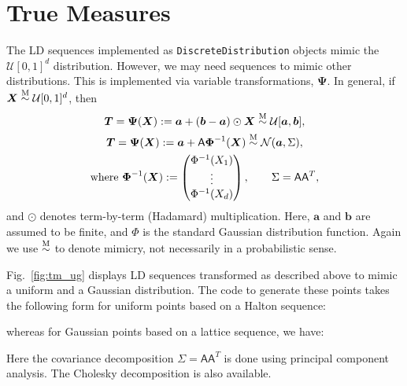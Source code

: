 \documentclass[graybox]{svmult}
\begin{document}
\section{True Measures}

The LD sequences implemented as \texttt{DiscreteDistribution} objects mimic the $\mathcal{U}[0,1]^d$ distribution.  However, we may need sequences to mimic other distributions.  This is implemented via variable transformations, $\boldsymbol{\Psi}$.  In general, if $\boldsymbol{X} \overset{\textup{M}}{\sim} \mathcal{U}[0,1]^d$, then
\begin{subequations} \label{eq:exampleVarTrans}
\begin{gather}
\boldsymbol{T} = \boldsymbol{\Psi}(\boldsymbol{X}) := \boldsymbol{a}  + (\boldsymbol{b} - \boldsymbol{a}) \odot \boldsymbol{X} \overset{\textup{M}}{\sim}  \mathcal{U}[\boldsymbol{a},\boldsymbol{b}], \\
\label{eq:exampleVarTransGauss}
\boldsymbol{T} = \boldsymbol{\Psi}(\boldsymbol{X}) := \boldsymbol{a} + \mathsf{A} \boldsymbol{\Phi}^{-1}(\boldsymbol{X})  \overset{\textup{M}}{\sim} \mathcal{N}(\boldsymbol{a}, \Sigma), \\
\nonumber  \text{where }  \boldsymbol{\Phi}^{-1}(\boldsymbol{X}) : = \begin{pmatrix} \Phi^{-1}(X_1) \\ \vdots \\ \Phi^{-1}(X_d)\end{pmatrix}, \qquad \Sigma = \mathsf{A} \mathsf{A}^T,
\end{gather}
\end{subequations}
and $\odot$ denotes term-by-term (Hadamard) multiplication.  Here, $\boldsymbol{a}$ and $\boldsymbol{b}$ are assumed to be finite, and $\Phi$ is the standard Gaussian distribution function.  Again we use $\overset{\textup{M}}{\sim}$ to denote mimicry, not necessarily in a probabilistic sense.

Fig.~\ref{fig:tm_ug} displays LD sequences transformed as described above to mimic a uniform and a Gaussian distribution.  The code to generate these points takes the following form for uniform points based on a Halton sequence: 

whereas for Gaussian points based on a lattice sequence, we have:

Here the covariance decomposition $\Sigma = \mathsf{A} \mathsf{A}^T$ is done using principal component analysis. The Cholesky decomposition is also available.
\end{document}
